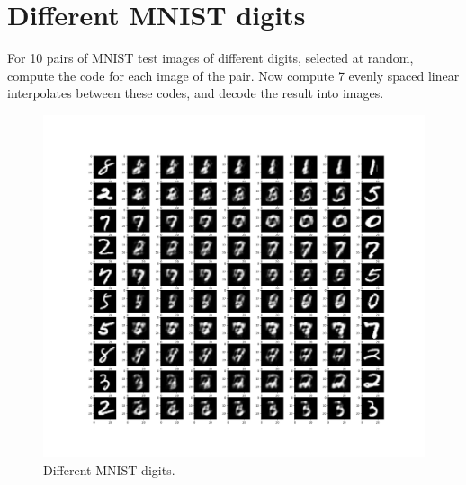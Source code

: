 \documentclass[a4paper]{article}
\begin{document}
\section{Different MNIST digits}
For 10 pairs of MNIST test images of different digits, selected at random, compute the code for each image of the pair. Now compute 7 evenly spaced linear interpolates between these codes, and decode the result into images. 
\begin{figure}[H]
\centering
\includegraphics[width=1\textwidth]{different.png}
\caption{\label{fig:data}Different MNIST digits.}
\end{figure}
\end{document}
